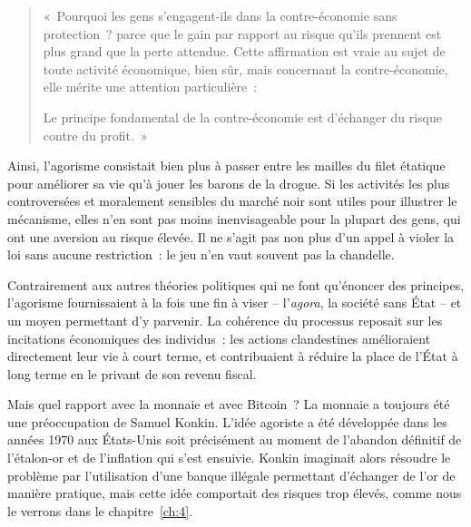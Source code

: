 \begin{quote}
«~Pourquoi les gens s'engagent-ils dans la contre-économie sans protection~? parce que le gain par rapport au risque qu'ils prennent est plus grand que la perte attendue. Cette affirmation est vraie au sujet de toute activité économique, bien sûr, mais concernant la contre-économie, elle mérite une attention particulière~:

Le principe fondamental de la contre-économie est d'échanger du risque contre du profit.~»
\end{quote} %

Ainsi, l'agorisme consistait bien plus à passer entre les mailles du filet étatique pour améliorer sa vie qu'à jouer les barons de la drogue. Si les activités les plus controversées et moralement sensibles du marché noir sont utiles pour illustrer le mécanisme, elles n'en sont pas moins inenvisageable pour la plupart des gens, qui ont une aversion au risque élevée. Il ne s'agit pas non plus d'un appel à violer la loi sans aucune restriction~: le jeu n'en vaut souvent pas la chandelle.

Contrairement aux autres théories politiques qui ne font qu'énoncer des principes, l'agorisme fournissaient à la fois une fin à viser -- l'\emph{agora}, la société sans État -- et un moyen permettant d'y parvenir. La cohérence du processus reposait sur les incitations économiques des individus~: les actions clandestines amélioraient directement leur vie à court terme, et contribuaient à réduire la place de l'État à long terme en le privant de son revenu fiscal.


Mais quel rapport avec la monnaie et avec Bitcoin~? La monnaie a toujours été une préoccupation de Samuel Konkin. L'idée agoriste a été développée dans les années 1970 aux États-Unis soit précisément au moment de l'abandon définitif de l'étalon-or et de l'inflation qui s'est ensuivie. Konkin imaginait alors résoudre le problème par l'utilisation d'une banque illégale permettant d'échanger de l'or de manière pratique, mais cette idée comportait des risques trop élevés, comme nous le verrons dans le chapitre~\ref{ch:4}.

